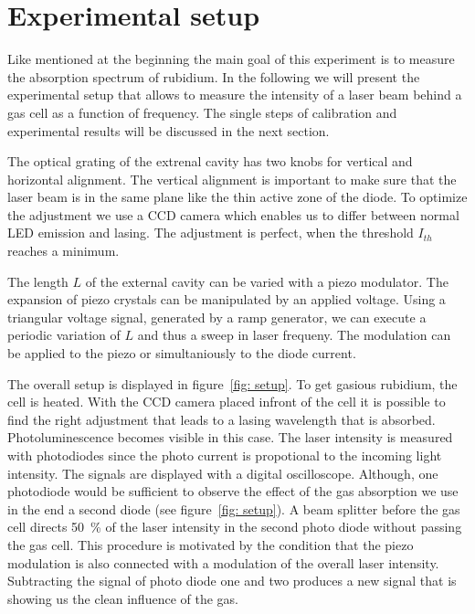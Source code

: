 \section{Experimental setup}
Like mentioned at the beginning the main goal of this experiment is to measure the absorption spectrum of rubidium.
In the following we will present the experimental setup that allows to measure the intensity of a laser beam
behind a gas cell as a function of frequency. The single steps of calibration and experimental results will be discussed
in the next section. 

The optical grating of the extrenal cavity has two knobs for vertical and horizontal alignment. The vertical alignment 
is important to make sure that the laser beam is in the same plane like the thin active zone of the diode. To optimize the adjustment 
we use a CCD camera which enables us to differ between normal LED emission and lasing. The adjustment is perfect, when the 
threshold $I_{th}$ reaches a minimum. 

The length $L$ of the external cavity can be varied with a piezo modulator. The expansion of piezo crystals can be manipulated by an
applied voltage. Using a triangular voltage signal, generated by a ramp generator, we can execute a periodic variation of $L$ and thus a sweep in laser frequeny. The
modulation can be applied to the piezo or simultaniously to the diode current.

The overall setup is displayed in figure~\ref{fig: setup}. To get gasious 
rubidium, the cell is heated. With the CCD camera placed infront of the cell it is possible to find the 
right adjustment that leads to a lasing wavelength that is absorbed. Photoluminescence becomes visible in this case.  
The laser intensity is measured with photodiodes since the photo current
is propotional to the incoming light intensity. The signals are displayed with a digital oscilloscope. 
Although, one photodiode would be sufficient to observe the effect of the gas absorption we use in the end 
a second diode (see figure~\ref{fig: setup}). A beam splitter before the gas cell directs \SI{50}{\percent}
of the laser intensity in the second photo diode without passing the gas cell. This procedure is motivated by the 
condition that the piezo modulation is also connected with a modulation of the overall laser intensity. Subtracting 
the signal of photo diode one and two produces a new signal that is showing us the clean influence of the gas.


